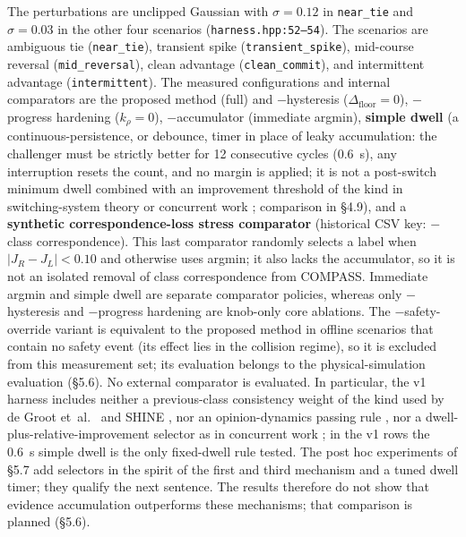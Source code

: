 \documentclass[11pt]{article}
\newcommand{\Dfloor}{\Delta_{\text{floor}}}
\newcommand{\code}[1]{\texttt{#1}}
\begin{document}
The perturbations are unclipped Gaussian with $\sigma=0.12$ in \code{near\_tie} and $\sigma=0.03$ in the other four scenarios (\code{harness.hpp:52--54}). The scenarios are ambiguous tie (\code{near\_tie}), transient spike (\code{transient\_spike}), mid-course reversal (\code{mid\_reversal}), clean advantage (\code{clean\_commit}), and intermittent advantage (\code{intermittent}). The measured configurations and internal comparators are the proposed method (full) and $-$hysteresis ($\Dfloor = 0$), $-$progress hardening ($k_\rho = 0$), $-$accumulator (immediate argmin), \textbf{simple dwell} (a continuous-persistence, or debounce, timer in place of leaky accumulation: the challenger must be strictly better for 12 consecutive cycles (0.6~s), any interruption resets the count, and no margin is applied; it is not a post-switch minimum dwell combined with an improvement threshold of the kind in switching-system theory \cite{hespanha1999dwell} or concurrent work \cite{li2026bigcbf}; comparison in \S4.9), and a \textbf{synthetic correspondence-loss stress comparator} (historical CSV key: $-$class correspondence). This last comparator randomly selects a label when $|J_R-J_L|<0.10$ and otherwise uses argmin; it also lacks the accumulator, so it is not an isolated removal of class correspondence from COMPASS. Immediate argmin and simple dwell are separate comparator policies, whereas only $-$hysteresis and $-$progress hardening are knob-only core ablations. The $-$safety-override variant is equivalent to the proposed method in offline scenarios that contain no safety event (its effect lies in the collision regime), so it is excluded from this measurement set; its evaluation belongs to the physical-simulation evaluation (\S5.6). No external comparator is evaluated. In particular, the v1 harness includes neither a previous-class consistency weight of the kind used by de Groot et~al.~\cite{degroot2024topology} and SHINE \cite{martinezbaselga2026shine}, nor an opinion-dynamics passing rule \cite{cathcart2023opinion}, nor a dwell-plus-relative-improvement selector as in concurrent work \cite{li2026bigcbf}; in the v1 rows the 0.6~s simple dwell is the only fixed-dwell rule tested. The post hoc experiments of \S5.7 add selectors in the spirit of the first and third mechanism and a tuned dwell timer; they qualify the next sentence. The results therefore do not show that evidence accumulation outperforms these mechanisms; that comparison is planned (\S5.6).
\end{document}
